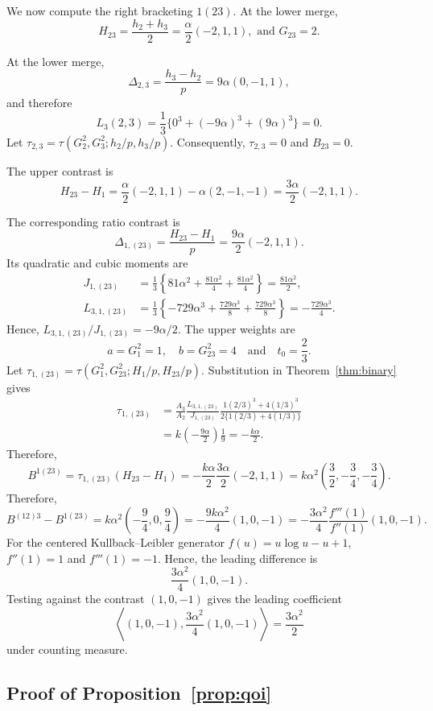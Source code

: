 \documentclass[11pt]{article}
\theoremstyle{plain}
\theoremstyle{definition}
\theoremstyle{definition}
\begin{document}
We now compute the right bracketing $1(23)$. At the lower merge,
\[
H_{23}=\frac{h_2+h_3}{2}=\frac{\alpha}{2}(-2,1,1),
\,\,\text{and}\,\,
G_{23}=2.
\]

At the lower merge,
\[
\Delta_{2,3}=\frac{h_3-h_2}{p}=9\alpha(0,-1,1),
\]
and therefore
\[
L_3(2,3)=\frac13\{0^3+(-9\alpha)^3+(9\alpha)^3\}=0.
\]
Let $\tau_{2,3}=\tau(G_2^2,G_3^2;h_2/p,h_3/p)$. Consequently, $\tau_{2,3}=0$ and $B_{23}=0$.

The upper contrast is
\[
H_{23}-H_1=\frac{\alpha}{2}(-2,1,1)-\alpha(2,-1,-1)=\frac{3\alpha}{2}(-2,1,1).
\]

The corresponding ratio contrast is
\[
\Delta_{1,(23)}=\frac{H_{23}-H_1}{p}=\frac{9\alpha}{2}(-2,1,1).
\]
Its quadratic and cubic moments are
\[
\begin{aligned}
J_{1,(23)}
&=\frac13\left\{81\alpha^2+\frac{81\alpha^2}{4}
                   +\frac{81\alpha^2}{4}\right\}
=\frac{81\alpha^2}{2},\\
L_{3,1,(23)}
&=\frac13\left\{-729\alpha^3+\frac{729\alpha^3}{8}
                    +\frac{729\alpha^3}{8}\right\}
=-\frac{729\alpha^3}{4}.
\end{aligned}
\]
Hence, $L_{3,1,(23)}/J_{1,(23)}=-9\alpha/2$. The upper weights are
\[
a=G_1^2=1,
\quad
b=G_{23}^2=4
\quad\text{and}\quad
t_0=\frac23.
\]
Let $\tau_{1,(23)}=\tau(G_1^2,G_{23}^2;H_1/p,H_{23}/p)$. Substitution in Theorem~\ref{thm:binary} gives
\[
\begin{aligned}
\tau_{1,(23)}
&=\frac{A_3}{A_2}\frac{L_{3,1,(23)}}{J_{1,(23)}}
  \frac{1(2/3)^3+4(1/3)^3}
       {2\{1(2/3)+4(1/3)\}}\\
&=k\left(-\frac{9\alpha}{2}\right)\frac19
=-\frac{k\alpha}{2}.
\end{aligned}
\]
Therefore,
\[
B^{1(23)}
=\tau_{1,(23)}(H_{23}-H_1)
=-\frac{k\alpha}{2}\frac{3\alpha}{2}(-2,1,1)
=k\alpha^2\left(\frac32,-\frac34,-\frac34\right).
\]
Therefore,
\[
B^{(12)3}-B^{1(23)}
=k\alpha^2\left(-\frac94,0,\frac94\right)
=-\frac{9k\alpha^2}{4}(1,0,-1)
=-\frac{3\alpha^2}{4}\frac{f'''(1)}{f''(1)}(1,0,-1).
\]
For the centered Kullback--Leibler generator $f(u)=u\log u-u+1$, $f''(1)=1$ and $f'''(1)=-1$. Hence, the leading difference is
\[
\frac{3\alpha^2}{4}(1,0,-1).
\]
Testing against the contrast $(1,0,-1)$ gives the leading coefficient
\[
\left\langle (1,0,-1),\frac{3\alpha^2}{4}(1,0,-1)\right\rangle=\frac{3\alpha^2}{2}
\]
under counting measure.

\subsection{Proof of Proposition~\ref{prop:qoi}}
\end{document}
